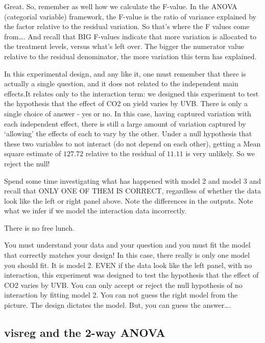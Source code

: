 \documentclass[
]{book}
\begin{document}
Great. So, remember as well how we calculate the F-value. In the ANOVA (categorial variable) framework, the F-value is the ratio of variance explained by the factor relative to the residual variation. So that's where the F values come from\ldots. And recall that BIG F-values indicate that more variation is allocated to the treatment levels, versus what's left over. The bigger the numerator value relative to the residual denominator, the more variation this term has explained.

In this experimental design, and any like it, one must remember that there is actually a single question, and it does not related to the independent main effects.It relates only to the interaction term: we designed this experiment to test the hypothesis that the effect of CO2 on yield varies by UVB. There is only a single choice of answer - yes or no. In this case, having captured variation with each independent effect, there is still a large amount of variation captured by `allowing' the effects of each to vary by the other. Under a null hypothesis that these two variables to not interact (do not depend on each other), getting a Mean square estimate of \(127.72\) relative to the residual of \(11.11\) is very unlikely. So we reject the null!

Spend some time investigating what has happened with model 2 and model 3 and recall that ONLY ONE OF THEM IS CORRECT, regardless of whether the data look like the left or right panel above. Note the differences in the outputs. Note what we infer if we model the interaction data incorrectly.

There is no free lunch.

You must understand your data and your question and you must fit the model that correctly matches your design! In this case, there really is only one model you should fit. It is model 2. EVEN if the data look like the left panel, with no interaction, this experiment was designed to test the hypothesis that the effect of CO2 varies by UVB. You can only accept or reject the null hypothesis of no interaction by fitting model 2. You can not guess the right model from the picture. The design dictates the model. But, you can guess the answer\ldots.

\hypertarget{visreg-and-the-2-way-anova}{%
\subsection{visreg and the 2-way ANOVA}\label{visreg-and-the-2-way-anova}}
\end{document}
